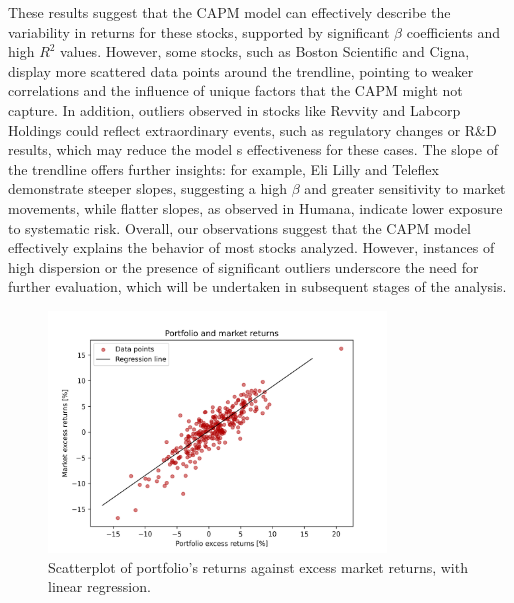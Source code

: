 These results suggest that the CAPM model can effectively describe the variability in returns for these stocks, supported by
significant $\beta$ coefficients and high $R^2$ values.
However, some stocks, such as Boston Scientific and Cigna, display more scattered data points around the trendline, 
pointing to weaker correlations and the influence of unique factors that the CAPM might not capture.
In addition, outliers observed in stocks like Revvity and Labcorp Holdings could reflect extraordinary events, such as 
regulatory changes or R\&D results, which may reduce the model s effectiveness for these cases.
The slope of the trendline offers further insights: for example, Eli Lilly and Teleflex demonstrate steeper slopes,
suggesting a high $\beta$ and greater sensitivity to market movements, while flatter slopes, as observed in Humana, indicate
lower exposure to systematic risk.
Overall, our observations suggest that the CAPM model effectively explains the behavior of most stocks analyzed. 
However, instances of high dispersion or the presence of significant outliers underscore the need for further evaluation, 
which will be undertaken in subsequent stages of the analysis.

\begin{figure}[h]
    \centering
    \includegraphics[width=0.8\textwidth]{images/portfolio_regression.png}
    \caption{Scatterplot of portfolio's returns against excess market returns, with linear regression.}\label{fig:portfolio_regression}
\end{figure}